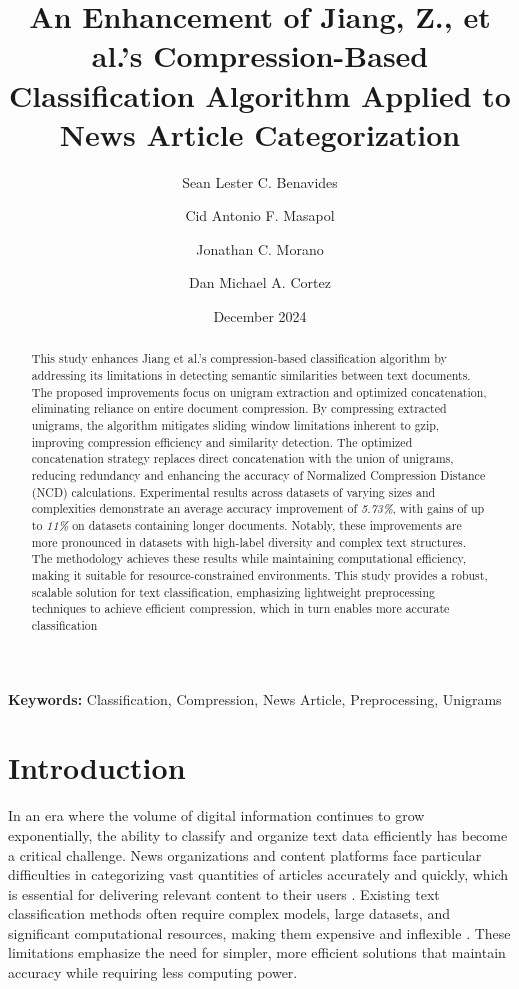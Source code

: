 \documentclass{article}
\title{\textbf{An Enhancement of Jiang, Z., et al.’s Compression-Based Classification Algorithm Applied to News Article Categorization}}
\author[1]{Sean Lester C. Benavides}
\author[2]{Cid Antonio F. Masapol}
\author[3]{Jonathan C. Morano}
\author[4]{Dan Michael A. Cortez}
\affil[1,2,3,4]{Department of Computer Science, Pamantasan ng Lungsod ng Maynila, Manila, Philippines}
\affil[ ]{\textit{\small 
\textsuperscript{1}\href{mailto:slcbenavides2021@plm.edu.ph}{slcbenavides2021@plm.edu.ph},  
\textsuperscript{2}\href{mailto:cafmasapol2019@plm.edu.ph}{cafmasapol2019@plm.edu.ph},  
\textsuperscript{3}\href{mailto:jcmorano@plm.edu.ph}{jcmorano@plm.edu.ph},  
\textsuperscript{4}\href{mailto:dmacortez@plm.edu.ph}{dmacortez@plm.edu.ph}}}
\date{December 2024}
\begin{document}
\maketitle

\begin{abstract}
    This study enhances Jiang et al.'s compression-based classification algorithm by addressing its limitations in detecting semantic similarities between text documents. The proposed improvements focus on unigram extraction and optimized concatenation, eliminating reliance on entire document compression. By compressing extracted unigrams, the algorithm mitigates sliding window limitations inherent to gzip, improving compression efficiency and similarity detection. The optimized concatenation strategy replaces direct concatenation with the union of unigrams, reducing redundancy and enhancing the accuracy of Normalized Compression Distance (NCD) calculations. Experimental results across datasets of varying sizes and complexities demonstrate an average accuracy improvement of \textit{5.73\%}, with gains of up to \textit{11\%} on datasets containing longer documents. Notably, these improvements are more pronounced in datasets with high-label diversity and complex text structures. The methodology achieves these results while maintaining computational efficiency, making it suitable for resource-constrained environments. This study provides a robust, scalable solution for text classification, emphasizing lightweight preprocessing techniques to achieve efficient compression, which in turn enables more accurate classification
\end{abstract}

\justify
\textbf{Keywords:} Classification, Compression, News Article, Preprocessing, Unigrams

\section{Introduction}

In an era where the volume of digital information continues to grow exponentially, the ability to classify and organize text data efficiently has become a critical challenge. News organizations and content platforms face particular difficulties in categorizing vast quantities of articles accurately and quickly, which is essential for delivering relevant content to their users \cite{Zhu2022}. Existing text classification methods often require complex models, large datasets, and significant computational resources, making them expensive and inflexible \cite{Jianan2023}. These limitations emphasize the need for simpler, more efficient solutions that maintain accuracy while requiring less computing power.
\end{document}
